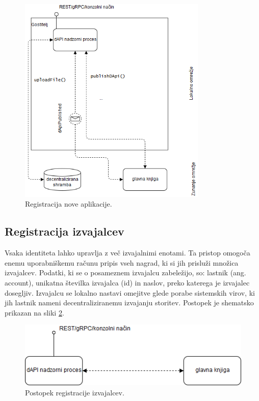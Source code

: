 \documentclass[a4paper, 12pt]{book}
\begin{document}
\begin{figure}[h]
	\centering
	\includegraphics[width=0.8\textwidth]{slike/register_api.png}
	\caption{Registracija nove aplikacije.}
	\label{register_api}
\end{figure}

\subsection{Registracija izvajalcev}
\label{registerWorker}
Vsaka identiteta lahko upravlja z več izvajalnimi enotami.
Ta pristop omogoča enemu uporabniškemu računu pripis vseh nagrad, ki si jih prisluži množica izvajalcev.
Podatki, ki se o posameznem izvajalcu zabeležijo, so: lastnik (ang. account), unikatna številka izvajalca (id) in naslov, preko katerega je izvajalec dosegljiv.
Izvajalcu se lokalno nastavi omejitve glede porabe sistemskih virov, ki jih lastnik nameni decentraliziranemu izvajanju storitev.
Postopek je shematsko prikazan na sliki \ref{register_worker}.

\begin{figure}[h]
	\centering
	\includegraphics[width=1.0\textwidth]{slike/register_worker.png}
	\caption{Postopek registracije izvajalcev.}
	\label{register_worker}
\end{figure}
\end{document}

